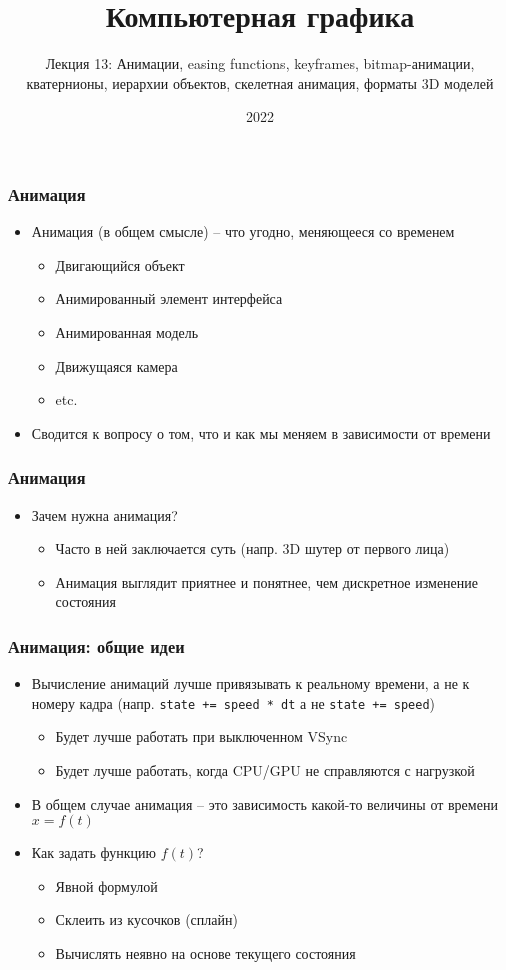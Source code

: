 \documentclass{beamer}
\title{Компьютерная графика}
\subtitle{Лекция 13: Анимации, easing functions, keyframes, bitmap-анимации, кватернионы, иерархии объектов, скелетная анимация, форматы 3D моделей}
\date{2022}
\begin{document}
\frame{\titlepage}

\begin{frame}[fragile]
\frametitle{Анимация}
\begin{itemize}
\item Анимация (в общем смысле) -- что угодно, меняющееся со временем
\pause
\begin{itemize}
\item Двигающийся объект
\item Анимированный элемент интерфейса
\item Анимированная модель
\item Движущаяся камера
\item etc.
\end{itemize}
\pause
\item Сводится к вопросу о том, что и как мы меняем в зависимости от времени
\end{itemize}
\end{frame}

\begin{frame}[fragile]
\frametitle{Анимация}
\begin{itemize}
\item Зачем нужна анимация?
\pause
\begin{itemize}
\item Часто в ней заключается суть (напр. 3D шутер от первого лица)
\pause
\item Анимация выглядит приятнее и понятнее, чем дискретное изменение состояния
\end{itemize}  
\end{itemize}
\end{frame}

\begin{frame}[fragile]
\frametitle{Анимация: общие идеи}
\begin{itemize}
\item Вычисление анимаций лучше привязывать к реальному времени, а не к номеру кадра (напр. \verb|state += speed * dt| а не \verb|state += speed|)
\begin{itemize}
\item Будет лучше работать при выключенном VSync
\item Будет лучше работать, когда CPU/GPU не справляются с нагрузкой
\end{itemize}
\pause
\item В общем случае анимация -- это зависимость какой-то величины от времени \begin{math}x = f(t)\end{math}
\pause
\item Как задать функцию \begin{math}f(t)\end{math}?
\pause
\begin{itemize}
\item Явной формулой
\item Склеить из кусочков (сплайн)
\item Вычислять неявно на основе текущего состояния
\end{itemize}
\end{itemize}
\end{frame}
\end{document}
